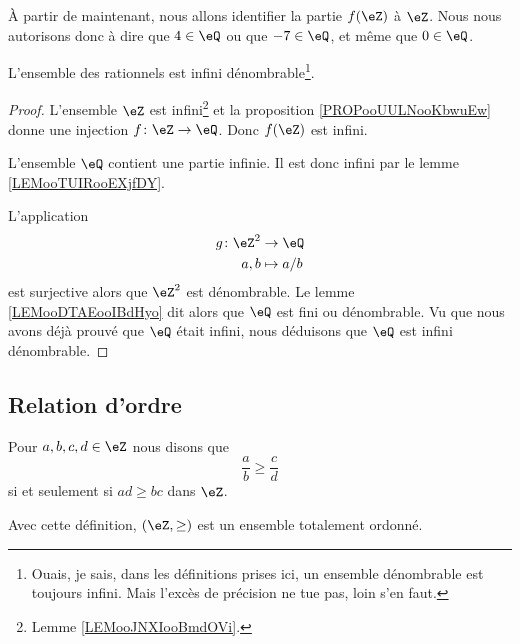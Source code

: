 \begin{normaltext}
	À partir de maintenant, nous allons identifier la partie \( f(\eZ)\) à \( \eZ\). Nous nous autorisons donc à dire que \( 4\in \eQ\) ou que \( -7\in \eQ\), et même que \( 0\in \eQ\).
\end{normaltext}

\begin{proposition}     \label{PROPooDHIAooZysvNs}
	L'ensemble des rationnels est infini dénombrable\footnote{Ouais, je sais, dans les définitions prises ici, un ensemble dénombrable est toujours infini. Mais l'excès de précision ne tue pas, loin s'en faut.}.
\end{proposition}

\begin{proof}
	L'ensemble \( \eZ\) est infini\footnote{Lemme \ref{LEMooJNXIooBmdOVi}.} et la proposition \ref{PROPooUULNooKbwuEw} donne une injection \( f\colon \eZ\to \eQ\). Donc \( f(\eZ)\) est infini.

	L'ensemble \( \eQ\) contient une partie infinie. Il est donc infini par le lemme \ref{LEMooTUIRooEXjfDY}.

	L'application
	\begin{equation}
		\begin{aligned}
			g\colon \eZ^2 & \to \eQ     \\
			a,b           & \mapsto a/b
		\end{aligned}
	\end{equation}
	est surjective alors que \( \eZ^2\) est dénombrable. Le lemme \ref{LEMooDTAEooIBdHyo} dit alors que \( \eQ\) est fini ou dénombrable. Vu que nous avons déjà prouvé que \( \eQ\) était infini, nous déduisons que \( \eQ\) est infini dénombrable.
\end{proof}


\subsection{Relation d'ordre}

\begin{propositionDef}      \label{DEFooZEXXooUtOhqB}
	Pour \( a,b,c,d\in \eZ\) nous disons que
	\begin{equation}
		\frac{ a }{ b }\geq \frac{ c }{ d }
	\end{equation}
	si et seulement si \( ad\geq bc\) dans \( \eZ\).

	Avec cette définition, \( (\eZ,\geq)\) est un ensemble totalement ordonné.
\end{propositionDef}

